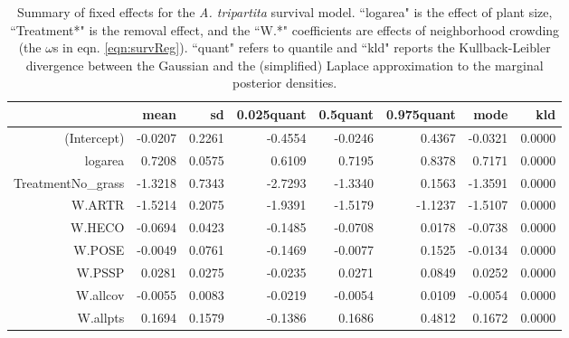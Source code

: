 \documentclass[11pt]{article}
\begin{document}
\begin{table}[ht]
\centering
\caption{Summary of fixed effects for the \textit{A. tripartita} survival model. ``logarea" is the effect of plant size, ``Treatment*" is the removal effect, and the ``W.*" coefficients 
are effects of neighborhood crowding (the $\omega$s in eqn. \ref{eqn:survReg}). ``quant" refers to quantile and ``kld" reports the Kullback-Leibler divergence between the Gaussian and the (simplified) Laplace approximation to the marginal posterior densities. } 
\label{ARTRsurvival}
\begin{tabular}{rrrrrrrr}
  \hline
 & mean & sd & 0.025quant & 0.5quant & 0.975quant & mode & kld \\ 
  \hline
(Intercept) & -0.0207 & 0.2261 & -0.4554 & -0.0246 & 0.4367 & -0.0321 & 0.0000 \\ 
  logarea & 0.7208 & 0.0575 & 0.6109 & 0.7195 & 0.8378 & 0.7171 & 0.0000 \\ 
  TreatmentNo\_grass & -1.3218 & 0.7343 & -2.7293 & -1.3340 & 0.1563 & -1.3591 & 0.0000 \\ 
  W.ARTR & -1.5214 & 0.2075 & -1.9391 & -1.5179 & -1.1237 & -1.5107 & 0.0000 \\ 
  W.HECO & -0.0694 & 0.0423 & -0.1485 & -0.0708 & 0.0178 & -0.0738 & 0.0000 \\ 
  W.POSE & -0.0049 & 0.0761 & -0.1469 & -0.0077 & 0.1525 & -0.0134 & 0.0000 \\ 
  W.PSSP & 0.0281 & 0.0275 & -0.0235 & 0.0271 & 0.0849 & 0.0252 & 0.0000 \\ 
  W.allcov & -0.0055 & 0.0083 & -0.0219 & -0.0054 & 0.0109 & -0.0054 & 0.0000 \\ 
  W.allpts & 0.1694 & 0.1579 & -0.1386 & 0.1686 & 0.4812 & 0.1672 & 0.0000 \\ 
   \hline
\end{tabular}
\end{table}
\end{document}
